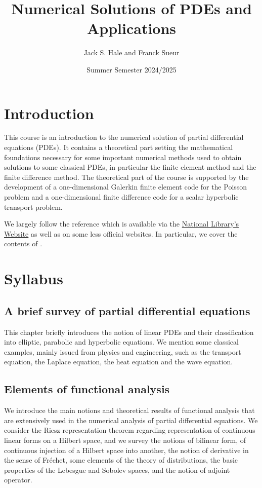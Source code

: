 \documentclass{article}
\title{Numerical Solutions of PDEs and Applications}
\author{Jack S. Hale and Franck Sueur}
\date{Summer Semester 2024/2025}
\begin{document}
\maketitle
\tableofcontents

\section{Introduction}

This course is an introduction to the numerical solution of partial
differential equations (PDEs). It contains a theoretical part setting the
mathematical foundations necessary for some important numerical methods used to
obtain solutions to some classical PDEs, in particular the finite element
method and the finite difference method. The theoretical part of the course is
supported by the development of a one-dimensional Galerkin finite element code
for the Poisson problem and a one-dimensional finite difference code for a
scalar hyperbolic transport problem.

We largely follow the reference \cite{Q} which is available via the
\href{https://a-z.lu}{National Library's Website} as well as on some less
official websites. In particular, we cover the contents of \cite[Chapters 1, 2,
3, 4, and 14]{Q}.

\section{Syllabus}

\subsection{A brief survey of partial differential equations}

This chapter briefly introduces the notion of linear PDEs and their
classification into elliptic, parabolic and hyperbolic  equations. We mention
some classical examples, mainly issued from physics and engineering, such as
the transport equation, the Laplace equation, the heat equation and the wave
equation. 

\subsection{Elements of functional analysis} 

We introduce the main notions and theoretical results of functional analysis
that are extensively used in the numerical analysis of partial differential
equations. We consider the Riesz representation theorem regarding
representation of continuous linear forms on a Hilbert space, and we survey the
notions of bilinear form, of continuous injection of a Hilbert space into
another, the notion of derivative in the sense of Fréchet, some elements of the
theory of distributions, the basic properties of the Lebesgue and Sobolev
spaces, and the notion of adjoint operator. 
\end{document}
